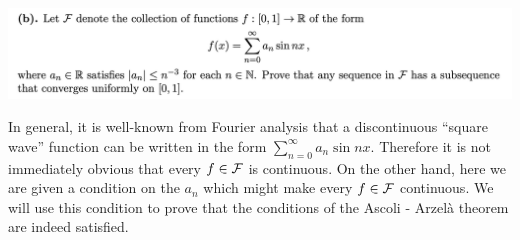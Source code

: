 \newpage
\begin{mdframed}
  \includegraphics[width=400pt]{img/analysis--berkeley-202a-final-c7c7.png}
\end{mdframed}


\begin{remark*}
  In general, it is well-known from Fourier analysis that a discontinuous ``square wave​'' function
  can be written in the form $\sum_{n=0}^\infty a_n \sin nx$. Therefore it is not immediately
  obvious that every $f \in \mathcal F$ is continuous. On the other hand, here we are given a condition
  on the $a_n$ which might make every $f \in \mathcal F$ continuous. We will use this condition to prove
  that the conditions of the Ascoli - Arzelà theorem are indeed satisfied.
\end{remark*}

